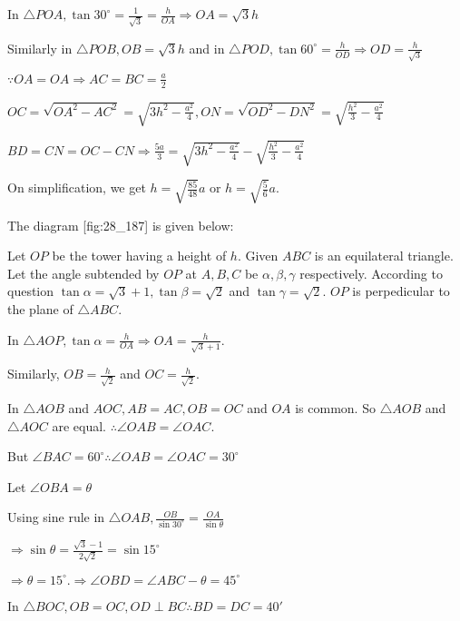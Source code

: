  In $\triangle POA, \tan30^\circ = \frac{1}{\sqrt{3}} = \frac{h}{OA} \Rightarrow OA = \sqrt{3}h$

  Similarly in $\triangle POB, OB = \sqrt{3}h$ and in $\triangle POD, \tan60^\circ =
  \frac{h}{OD} \Rightarrow OD = \frac{h}{\sqrt{3}}$

  $\because OA = OA \Rightarrow AC = BC = \frac{a}{2}$

  $OC = \sqrt{OA^2 - AC^2} = \sqrt{3h^2 - \frac{a^2}{4}}, ON = \sqrt{OD^2 - DN^2} =
  \sqrt{\frac{h^2}{3} - \frac{a^2}{4}}$

  $BD = CN = OC - CN \Rightarrow \frac{5a}{3} = \sqrt{3h^2 - \frac{a^2}{4}} - \sqrt{\frac{h^2}{3} -
    \frac{a^2}{4}}$

  On simplification, we get $h = \sqrt{\frac{85}{48}}a$ or $h = \sqrt{\frac{5}{6}}a$.

\item The diagram [fig:28_187] is given below:

  \startplacefigure[reference=fig:28_187]
    \externalfigure[28_187.pdf]
  \stopplacefigure

  Let $OP$ be the tower having a height of $h$. Given $ABC$ is an equilateral
  triangle. Let the angle subtended by $OP$ at $A, B, C$ be $\alpha, \beta, \gamma$
  respectively. According to question $\tan\alpha = \sqrt{3} + 1, \tan\beta = \sqrt{2}$ and
  $\tan\gamma = \sqrt{2}$. $OP$ is perpedicular to the plane of $\triangle ABC$.

  In $\triangle AOP, \tan\alpha = \frac{h}{OA}\Rightarrow OA = \frac{h}{\sqrt{3} + 1}$.

  Similarly, $OB = \frac{h}{\sqrt{2}}$ and $OC = \frac{h}{\sqrt{2}}$.

  In $\triangle AOB$ and $AOC, AB = AC, OB = OC$ and $OA$ is common. So
  $\triangle AOB$ and $\triangle AOC$ are equal. $\therefore \angle OAB = \angle OAC$.

  But $\angle BAC = 60^\circ \therefore \angle OAB = \angle OAC = 30^\circ$

  Let $\angle OBA = \theta$

  Using sine rule in $\triangle OAB, \frac{OB}{\sin30^\circ} = \frac{OA}{\sin\theta}$

  $\Rightarrow \sin\theta = \frac{\sqrt{3} - 1}{2\sqrt{2}} = \sin15^\circ$

  $\Rightarrow \theta = 15^\circ. \Rightarrow \angle OBD = \angle ABC - \theta = 45^\circ$

  In $\triangle BOC, OB = OC, OD\perp BC \therefore BD = DC = 40'$

